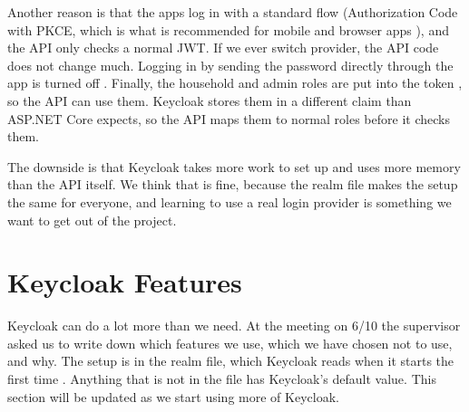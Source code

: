 \documentclass[a4paper,11pt]{article}
\begin{document}
Another reason is that the apps log in with a standard flow (Authorization Code with PKCE, which is what is recommended for mobile and browser apps \cite[sec.~2.1.1]{ietf-rfc9700-oauth-security-bcp}), and the API only checks a normal JWT. If we ever switch provider, the API code does not change much. Logging in by sending the password directly through the app is turned off \cite[sec.~2.4]{ietf-rfc9700-oauth-security-bcp}. Finally, the household and admin roles are put into the token \cite[sec.~Role scope mappings]{keycloak-server-admin-guide}, so the API can use them. Keycloak stores them in a different claim than ASP.NET Core expects, so the API maps them to normal roles before it checks them.

The downside is that Keycloak takes more work to set up and uses more memory than the API itself. We think that is fine, because the realm file makes the setup the same for everyone, and learning to use a real login provider is something we want to get out of the project.

\section{Keycloak Features}
\label{sec:keycloak-features}
Keycloak can do a lot more than we need. At the meeting on 6/10 the supervisor asked us to write down which features we use, which we have chosen not to use, and why. The setup is in the realm file, which Keycloak reads when it starts the first time \cite{keycloak-import-export}. Anything that is not in the file has Keycloak's default value. This section will be updated as we start using more of Keycloak.
\end{document}
